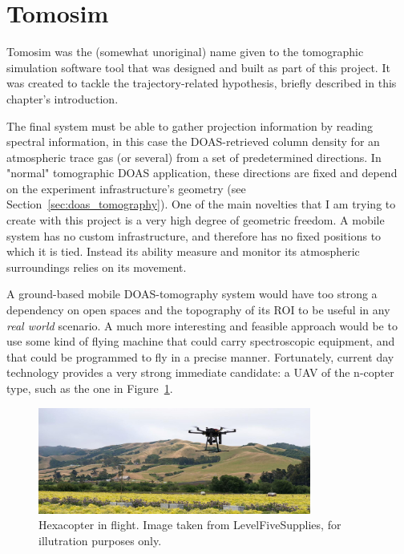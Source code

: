 \section{Tomosim}%
\label{sec:tomosim}

Tomosim was the (somewhat unoriginal) name given to the tomographic
simulation software tool that was designed and built as part of this
project. It was created to tackle the trajectory-related hypothesis,
briefly described in this chapter's introduction.

The final system must be able to gather projection information by
reading spectral information, in this case the \gls{DOAS}-retrieved
column density for an atmospheric trace gas (or several) from a set of
predetermined directions. In "normal" tomographic \gls{DOAS}
application, these directions are fixed and depend on the experiment
infrastructure's geometry (see Section~\ref{sec:doas_tomography}). One
of the main novelties that I am trying to create with this project is a
very high degree of geometric freedom. A mobile system has no custom
infrastructure, and therefore has no fixed positions to which it is
tied. Instead its ability measure and monitor its atmospheric
surroundings relies on its movement. 

A ground-based mobile \gls{DOAS}-tomography system would have too strong
a dependency on open spaces and the topography of its \gls{ROI} to be
useful in any \textit{real world} scenario. A much more interesting and
feasible approach would be to use some kind of flying machine that could
carry spectroscopic equipment, and that could be programmed to fly in a
precise manner. Fortunately, current day technology provides a very
strong immediate candidate: a \gls{UAV} of the n-copter type, such as
the one in Figure~\ref{fig:an_hexacopter}.

\begin{figure}[htpb]
    \centering
    \includegraphics[width=0.8\textwidth]{img/jpg/hexa_in_flight.jpg}
    \caption{Hexacopter in flight. Image taken from
    LevelFiveSupplies\cite{LevelFiveSupplies2021}, for illutration
    purposes only.}
    \label{fig:an_hexacopter}
\end{figure}

